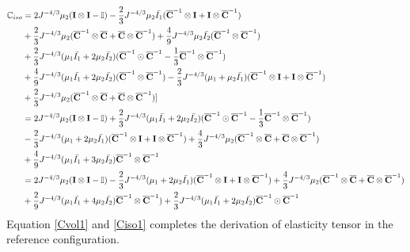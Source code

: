 \begin{equation} \label{Ciso1}
\begin{split}
\mathbb{C}_{iso} 
&= 
2{J}^{-4/3}\mu_2(\bold{I} \otimes \bold{I} - \mathbb{I}) - \frac{2}{3}J^{-4/3}\mu_2\bar{I_1}({\overline{\bold{C}}}^{-1} \otimes \bold{I} + \bold{I} \otimes {\overline{\bold{C}}}^{-1}) \\
&+
\frac{2}{3}J^{-4/3}\mu_2({\overline{\bold{C}}}^{-1} \otimes {\overline{\bold{C}}} + {\overline{\bold{C}}} \otimes {\overline{\bold{C}}}^{-1}) + \frac{4}{9}J^{-4/3}\mu_2\bar{I_2}({\overline{\bold{C}}}^{-1} \otimes {\overline{\bold{C}}}^{-1}) \\
&+
\frac{2}{3}J^{-4/3}(\mu_1\bar{I_1} + 2\mu_2\bar{I_2})({\overline{\bold{C}}}^{-1} \odot {{\overline{\bold{C}}}}^{-1} - \frac{1}{3}{{\overline{\bold{C}}}}^{-1} \otimes {\overline{{\bold{C}}}}^{-1}) \\
&+
\frac{4}{9}J^{-4/3} (\mu_1\bar{I_1} + 2\mu_2\bar{I_2})({\overline{\bold{C}}}^{-1} \otimes {\overline{\bold{C}}}^{-1}) - \frac{2}{3}J^{-4/3}(\mu_1+\mu_2\bar{I_1})({\overline{\bold{C}}}^{-1} \otimes \bold{I} + \bold{I} \otimes {\overline{\bold{C}}}^{-1})\\
&+ \frac{2}{3}J^{-4/3}\mu_2({\overline{\bold{C}}}^{-1} \otimes {\overline{\bold{C}}}+{\overline{\bold{C}}} \otimes {\overline{\bold{C}}}^{-1}) ] \\
&=
2{J}^{-4/3}\mu_2(\bold{I} \otimes \bold{I} - \mathbb{I}) + \frac{2}{3}J^{-4/3}(\mu_1\bar{I_1} + 2\mu_2\bar{I_2})({\overline{\bold{C}}}^{-1} \odot {\overline{\bold{C}}}^{-1} - \frac{1}{3}{\overline{\bold{C}}}^{-1} \otimes {\overline{\bold{C}}}^{-1}) \\
&-
\frac{2}{3}J^{-4/3}(\mu_1 + 2\mu_2\bar{I_1})({\overline{\bold{C}}}^{-1} \otimes \bold{I} + \bold{I} \otimes {\overline{\bold{C}}}^{-1}) + \frac{4}{3}J^{-4/3}\mu_2({\overline{\bold{C}}}^{-1} \otimes {\overline{\bold{C}}} + {\overline{\bold{C}}} \otimes {\overline{\bold{C}}}^{-1}) \\
&+
\frac{4}{9}J^{-4/3}(\mu_1\bar{I_1} + 3\mu_2\bar{I_2}){\overline{\bold{C}}}^{-1} \otimes {\overline{\bold{C}}}^{-1} \\
&=
2{J}^{-4/3}\mu_2(\bold{I} \otimes \bold{I} - \mathbb{I}) - \frac{2}{3}J^{-4/3}(\mu_1 + 2\mu_2\bar{I_1})({\overline{\bold{C}}}^{-1} \otimes \bold{I} + \bold{I} \otimes {\overline{\bold{C}}}^{-1}) + \frac{4}{3}J^{-4/3}\mu_2({\overline{\bold{C}}}^{-1} \otimes {\overline{\bold{C}}} + {\overline{\bold{C}}} \otimes {\overline{\bold{C}}}^{-1}) \\
&+
\frac{2}{9}J^{-4/3}(\mu_1\bar{I_1} + 4\mu_2\bar{I_2}) {\overline{\bold{C}}}^{-1} \otimes {\overline{\bold{C}}}^{-1}) + \frac{2}{3}J^{-4/3}(\mu_1\bar{I_1} + 2\mu_2\bar{I_2}){\overline{\bold{C}}}^{-1} \odot {\overline{\bold{C}}}^{-1} 
\end{split}
\end{equation} 
Equation \ref{Cvol1} and \ref{Ciso1} completes the derivation of elasticity tensor in the reference configuration.



